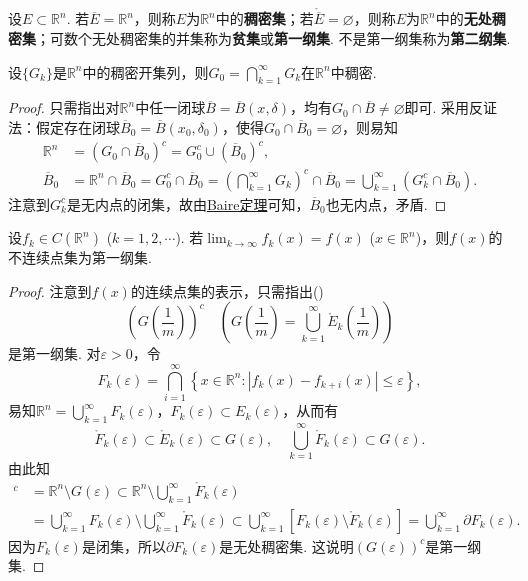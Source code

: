 \documentclass[../../main.tex]{subfiles}%
\begin{document}
\begin{definition}
设$E\subset\mathbb{R}^n$. 若$\overline{E}=\mathbb{R}^n$，则称$E$为$\mathbb{R}^n$中的\textbf{稠密集}；若$\mathring{\overline{E}}=\varnothing$，则称$E$为$\mathbb{R}^n$中的\textbf{无处稠密集}；可数个无处稠密集的并集称为\textbf{贫集}或\textbf{第一纲集}. 不是第一纲集称为\textbf{第二纲集}.
\end{definition}

\begin{example}\label{example:例14}
设$\{G_k\}$是$\mathbb{R}^n$中的稠密开集列，则$G_0 = \bigcap_{k = 1}^{\infty}G_k$在$\mathbb{R}^n$中稠密.
\end{example}
\begin{proof}
只需指出对$\mathbb{R}^n$中任一闭球$\overline{B}=\overline{B}(x,\delta)$，均有$G_0\cap\overline{B}\neq\varnothing$即可. 采用反证法：假定存在闭球$\overline{B}_0=\overline{B}(x_0,\delta_0)$，使得$G_0\cap\overline{B}_0=\varnothing$，则易知
\begin{align*}
\mathbb{R}^n&=(G_0\cap\overline{B}_0)^c = G_0^c\cup(\overline{B}_0)^c,\\
\overline{B}_0&=\mathbb{R}^n\cap\overline{B}_0 = G_0^c\cap\overline{B}_0=\left(\bigcap_{k = 1}^{\infty}G_k\right)^c\cap\overline{B}_0=\bigcup_{k = 1}^{\infty}(G_k^c\cap\overline{B}_0).
\end{align*}
注意到$G_k^c$是无内点的闭集，故由\hyperref[theorem:Baire定理]{Baire定理}可知，$\overline{B}_0$也无内点，矛盾.
\end{proof}

\begin{example}\label{example:例15}
设$f_k\in C(\mathbb{R}^n)$ ($k = 1,2,\cdots$). 若$\lim_{k\to\infty}f_k(x)=f(x)$ ($x\in\mathbb{R}^n$)，则$f(x)$的不连续点集为第一纲集.
\end{example}
\begin{proof}
注意到$f(x)$的连续点集的表示，只需指出()
\[
\left(G\left(\frac{1}{m}\right)\right)^c \quad \left(G\left(\frac{1}{m}\right)=\bigcup_{k = 1}^{\infty}\mathring{E}_k\left(\frac{1}{m}\right)\right)
\]
是第一纲集. 对$\varepsilon>0$，令
\[
F_k(\varepsilon)=\bigcap_{i = 1}^{\infty}\left\{x\in\mathbb{R}^n: |f_k(x)-f_{k + i}(x)|\leqslant\varepsilon\right\},
\]
易知$\mathbb{R}^n=\bigcup_{k = 1}^{\infty}F_k(\varepsilon)$，$F_k(\varepsilon)\subset E_k(\varepsilon)$，从而有
\[
\mathring{F}_k(\varepsilon)\subset\mathring{E}_k(\varepsilon)\subset G(\varepsilon), \quad \bigcup_{k = 1}^{\infty}\mathring{F}_k(\varepsilon)\subset G(\varepsilon).
\]
由此知
\begin{align*}
[G(\varepsilon)]^c&=\mathbb{R}^n\setminus G(\varepsilon)\subset\mathbb{R}^n\setminus\bigcup_{k = 1}^{\infty}\mathring{F}_k(\varepsilon)\\
&=\bigcup_{k = 1}^{\infty}F_k(\varepsilon)\setminus\bigcup_{k = 1}^{\infty}\mathring{F}_k(\varepsilon)\subset\bigcup_{k = 1}^{\infty}[F_k(\varepsilon)\setminus\mathring{F}_k(\varepsilon)]=\bigcup_{k = 1}^{\infty}\partial F_k(\varepsilon).
\end{align*}
因为$F_k(\varepsilon)$是闭集，所以$\partial F_k(\varepsilon)$是无处稠密集. 这说明$(G(\varepsilon))^c$是第一纲集. 
\end{proof}
\end{document}
